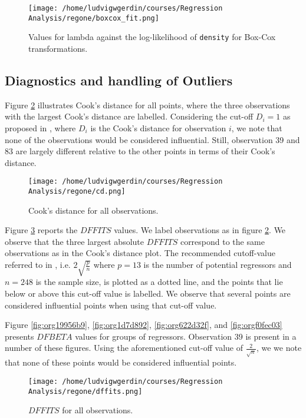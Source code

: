 \documentclass[11pt]{article}
\begin{document}
\begin{figure}[h]
\centering
\texttt{[image: /home/ludvigwgerdin/courses/Regression Analysis/regone/boxcox\_fit.png]}
\caption{\label{fig:org3e05a7c}
Values for lambda against the log-likelihood of \texttt{density} for Box-Cox transformations.}
\end{figure}

\subsection{Diagnostics and handling of Outliers}
\label{sec:org748824c}

Figure \ref{fig:orga01a23b} illustrates Cook's distance for all points, where the three observations with the largest 
Cook's distance are labelled. Considering the cut-off \(D_i = 1\) as proposed in \cite{Montgomery2012}, 
where \(D_i\) is the Cook's distance for observation \(i\), we note that none of the observations would be 
considered influential. Still, observation 39 and 83 are largely different relative
to the other points in terms of their Cook's distance. 

\begin{figure}[h]
\centering
\texttt{[image: /home/ludvigwgerdin/courses/Regression Analysis/regone/cd.png]}
\caption{\label{fig:orga01a23b}
Cook's distance for all observations.}
\end{figure}

Figure \ref{fig:org6de3879} reports the \(DFFITS\) values. We label observations as in figure \ref{fig:orga01a23b}. We observe 
that the three largest absolute \(DFFITS\) correspond to the same observations as in the Cook's distance plot.
The recommended cutoff-value referred to in \cite{Montgomery2012}, i.e. \(2\sqrt{\frac{p}{n}}\)
where \(p = 13\) is the number of potential regressors and \(n = 248\) is the sample size, is 
plotted as a dotted line, and the points that lie below or above this cut-off value is labelled.
We observe that several points are considered influential points when using that cut-off value.

Figure \ref{fig:org19956b9}, \ref{fig:org1d7d892}, \ref{fig:org622d32f}, and
\ref{fig:orgf0fec03} presents \(DFBETA\) values for groups of regressors. Observation 39
is present in a number of these figures. Using the aforementioned cut-off value of \(\frac{2}{\sqrt{n}}\), we 
we note that none of these points would be considered influential points.
\begin{figure}[h]
\centering
\texttt{[image: /home/ludvigwgerdin/courses/Regression Analysis/regone/dffits.png]}
\caption{\label{fig:org6de3879}
\(DFFITS\) for all observations.}
\end{figure}
\end{document}
